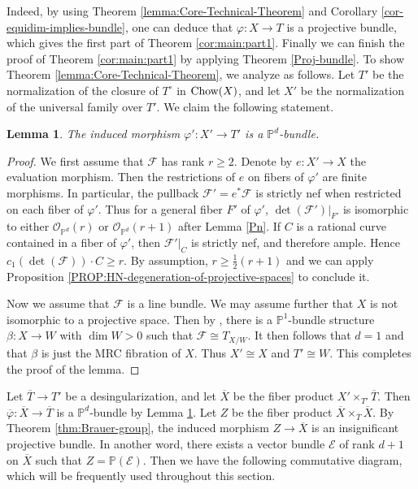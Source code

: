 \documentclass[english,reqno]{amsart}
\newcommand\bbP{{\mathbb P}}
\newcommand\sE{{\mathscr E}}
\newcommand\sF{{\mathscr F}}
\newcommand\sO{{\mathscr O}}
\newcommand{\Chow}[1]{\ensuremath{\mbox{\rm Chow}(#1)}}
\theoremstyle{plain}
\newtheorem{lemma}[thm]{Lemma}
\theoremstyle{definition}
\numberwithin{equation}{section} %
\begin{document}
\noindent Indeed, by using Theorem \ref{lemma:Core-Technical-Theorem} and  Corollary \ref{cor-equidim-implies-bundle}, one can deduce  that   $\varphi\colon X\to T$ is a projective bundle, which gives the first part of Theorem 	\ref{cor:main:part1}. Finally we can finish the proof of Theorem \ref{cor:main:part1} by applying Theorem \ref{Proj-bundle}.
To show  Theorem 	\ref{lemma:Core-Technical-Theorem}, we analyze as follows. Let $T'$ be the normalization of the closure of $T^\circ$ in $\Chow{X}$, and let $X'$ be the normalization of the universal family over $T'$. We claim the following statement.

\begin{lemma}\label{lemma:bundle}
	The induced morphism $\varphi'\colon X'\rightarrow T'$ is a $\bbP^d$-bundle.
\end{lemma}

\begin{proof}
	We first assume that $\sF$ has rank $r\geqslant 2$.
	Denote by $e\colon X'\rightarrow X$ the evaluation morphism. Then the restrictions of  $e$ on fibers of $\varphi'$ are finite morphisms. In particular, the pullback $\sF'=e^*\sF$ is strictly nef when restricted on each fiber of $\varphi'$.
	Thus for a general fiber $F'$ of $\varphi'$, $\det(\sF')\vert_{F'}$ is isomorphic to either $\sO_{\bbP^d}(r)$ or $\sO_{\bbP^d}(r+1)$ after Lemma \ref{Pn}.
	If $C$ is a rational curve contained in a fiber  of $\varphi'$, then $\sF'\vert_C$ is strictly nef, and therefore ample. Hence  $c_1(\det(\sF))\cdot C\geqslant r$.
	By assumption, $r\geqslant \frac{1}{2}(r+1)$ and  we can apply Proposition \ref{PROP:HN-degeneration-of-projective-spaces} to conclude it.
	
	Now we assume that $\sF$ is a line bundle. We may assume further that $X$ is not isomorphic to a projective space. Then by \cite[Corollaire]{Druel2004},  there is a $\bbP^1$-bundle structure $\beta \colon X\to W$ with $\dim W > 0$ such that $\sF\cong T_{X/W}$. It then follows that $d=1$ and that $\beta$ is just the MRC fibration of $X$. Thus $X'\cong X$ and $T'\cong W$. This completes the proof of the lemma.
\end{proof}

Let $\overline{T}\rightarrow T'$ be a desingularization, and let $\overline{X}$ be the fiber product $X'\times_{T'}\overline{T}$.
Then $\overline{\varphi}\colon  \overline{X}\rightarrow \overline{T}$ is a $\bbP^d$-bundle by Lemma \ref{lemma:bundle}.
Let $Z$ be the fiber product $\overline{X}\times_{\overline{T}}\overline{X}$.
By Theorem \ref{thm:Brauer-group}, the induced morphism $Z\rightarrow \overline{X}$ is an insignificant projective bundle. In another word,  there exists a vector bundle $\sE$ of rank $d+1$ on $\overline{X}$ such that $Z=\bbP(\sE)$. Then we have the following commutative diagram, which will be frequently used throughout this section.
\end{document}
